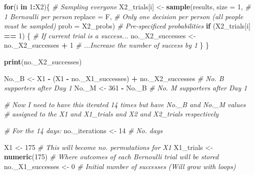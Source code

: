 \documentclass[
]{article}
\newenvironment{Shaded}{\begin{snugshade}}{\end{snugshade}}
\newcommand{\AttributeTok}[1]{\textcolor[rgb]{0.13,0.29,0.53}{#1}}
\newcommand{\CommentTok}[1]{\textcolor[rgb]{0.56,0.35,0.01}{\textit{#1}}}
\newcommand{\ControlFlowTok}[1]{\textcolor[rgb]{0.13,0.29,0.53}{\textbf{#1}}}
\newcommand{\DecValTok}[1]{\textcolor[rgb]{0.00,0.00,0.81}{#1}}
\newcommand{\FunctionTok}[1]{\textcolor[rgb]{0.13,0.29,0.53}{\textbf{#1}}}
\newcommand{\NormalTok}[1]{#1}
\newcommand{\OtherTok}[1]{\textcolor[rgb]{0.56,0.35,0.01}{#1}}
\newcommand{\SpecialCharTok}[1]{\textcolor[rgb]{0.81,0.36,0.00}{\textbf{#1}}}
\begin{document}
\begin{Shaded}
\begin{Highlighting}[]
\ControlFlowTok{for}\NormalTok{(i }\ControlFlowTok{in} \DecValTok{1}\SpecialCharTok{:}\NormalTok{X2)\{  }\CommentTok{\# Sampling everyone}
\NormalTok{  X2\_trials[i] }\OtherTok{\textless{}{-}} \FunctionTok{sample}\NormalTok{(results, }
                      \AttributeTok{size =} \DecValTok{1}\NormalTok{, }\CommentTok{\# 1 Bernoulli per person}
                      \AttributeTok{replace =}\NormalTok{ F,  }\CommentTok{\# Only one decision per person (all people must be sampled)}
                      \AttributeTok{prob =}\NormalTok{ X2\_probs)  }\CommentTok{\# Pre{-}specificed probabilities}
  \ControlFlowTok{if}\NormalTok{ (X2\_trials[i] }\SpecialCharTok{==} \DecValTok{1}\NormalTok{) \{  }\CommentTok{\# \textquotesingle{}If current trial is a success...\textquotesingle{}}
\NormalTok{    no.\_X2\_successes }\OtherTok{\textless{}{-}}\NormalTok{ no.\_X2\_successes }\SpecialCharTok{+} \DecValTok{1}  \CommentTok{\# \textquotesingle{}...Increase the number of success by 1}
\NormalTok{  \}}
\NormalTok{\}}


\FunctionTok{print}\NormalTok{(no.\_X2\_successes)}

\NormalTok{No.\_B }\OtherTok{\textless{}{-}}\NormalTok{ X1 }\SpecialCharTok{{-}}\NormalTok{ (X1 }\SpecialCharTok{{-}}\NormalTok{ no.\_X1\_successes) }\SpecialCharTok{+}\NormalTok{ no.\_X2\_successes  }\CommentTok{\# No. B supporters after Day 1}
\NormalTok{No.\_M }\OtherTok{\textless{}{-}} \DecValTok{361} \SpecialCharTok{{-}}\NormalTok{ No.\_B  }\CommentTok{\# No. M supporters after Day 1}









\CommentTok{\# Now I need to have this iterated 14 times but have \textquotesingle{}No.\_B\textquotesingle{} and \textquotesingle{}No.\_M\textquotesingle{} values}
\CommentTok{\# assigned to the \textquotesingle{}X1\textquotesingle{} and \textquotesingle{}X1\_trials\textquotesingle{} and \textquotesingle{}X2\textquotesingle{} and \textquotesingle{}X2\_trials\textquotesingle{} respectively }

\CommentTok{\# For the 14 days:}
\NormalTok{no.\_iterations }\OtherTok{\textless{}{-}} \DecValTok{14}  \CommentTok{\# No. days }


\NormalTok{X1 }\OtherTok{\textless{}{-}} \DecValTok{175}  \CommentTok{\# This will become no. permutations for X1}
\NormalTok{X1\_trials }\OtherTok{\textless{}{-}} \FunctionTok{numeric}\NormalTok{(}\DecValTok{175}\NormalTok{)  }\CommentTok{\# Where outcomes of each Bernoulli trial will be stored}
\NormalTok{no.\_X1\_successes }\OtherTok{\textless{}{-}} \DecValTok{0}  \CommentTok{\# Initial number of successes (Will grow with loops)}


\end{Highlighting}
\end{Shaded}
\end{document}
